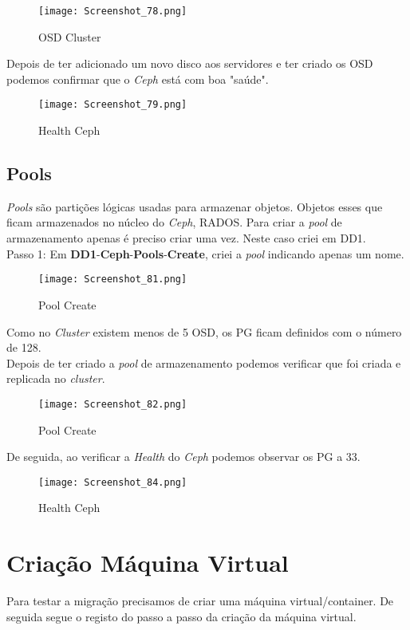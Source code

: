 \begin{figure}[H]
\center
\texttt{[image: Screenshot\_78.png]}
\caption{OSD Cluster}
\end{figure}

Depois de ter adicionado um novo disco aos servidores e ter criado os \ac{OSD} podemos confirmar que o \textit{Ceph} está com boa "saúde". 
\begin{figure}[H]
\center
\texttt{[image: Screenshot\_79.png]}
\caption{Health Ceph}
\end{figure}

\newpage
\subsection{Pools}
\textit{Pools} são partições lógicas usadas para armazenar objetos. Objetos esses que ficam armazenados no núcleo do \textit{Ceph}, \ac{RADOS}. Para criar a \textit{pool} de armazenamento apenas é preciso criar uma vez. Neste caso criei em DD1.\\

Passo 1: Em \textbf{DD1}-\textbf{Ceph}-\textbf{Pools}-\textbf{Create}, criei a \textit{pool} indicando apenas um nome.
\begin{figure}[H]
\center
\texttt{[image: Screenshot\_81.png]}
\caption{Pool Create}
\end{figure}

Como no \textit{Cluster} existem menos de 5 OSD, os \ac{PG} ficam definidos com o número de 128.\\

Depois de ter criado a \textit{pool} de armazenamento podemos verificar que foi criada e replicada no \textit{cluster}.
\begin{figure}[H]
\center
\texttt{[image: Screenshot\_82.png]}
\caption{Pool Create}
\end{figure}

\newpage
De seguida, ao verificar a \textit{Health} do \textit{Ceph} podemos observar os \ac{PG} a 33.
\begin{figure}[H]
\center
\texttt{[image: Screenshot\_84.png]}
\caption{Health Ceph}
\end{figure}

\newpage
\section{Criação Máquina Virtual}
Para testar a migração precisamos de criar uma máquina virtual/container. De seguida segue o registo do passo a passo da criação da máquina virtual.\\

